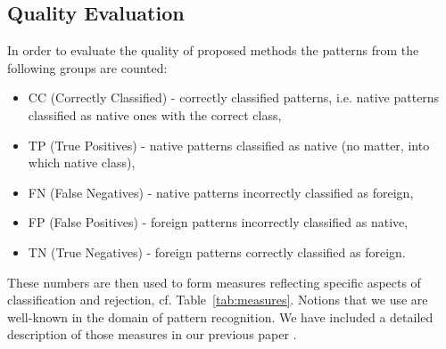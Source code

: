 \documentclass{llncs}
\begin{document}


\subsection{Quality Evaluation}

In order to evaluate the quality of proposed methods the patterns from the following groups are counted:
\begin{itemize}
\item CC  (Correctly Classified) - correctly classified patterns, i.e. native patterns classified as native ones with the correct class,
\item TP  (True Positives) - native patterns classified as native (no matter, into which native class),
\item FN  (False Negatives) - native patterns incorrectly classified as foreign,
\item FP  (False Positives) - foreign patterns incorrectly classified as native,
\item TN  (True Negatives) - foreign patterns correctly classified as foreign.
\end{itemize}
These numbers are then used to form measures reflecting specific aspects of classification and rejection, cf. Table~\ref{tab:measures}. Notions that we use are well-known in the domain of pattern recognition. We have included a detailed description of those measures in our previous paper \cite{HomendaICAART2015}.
\end{document}
